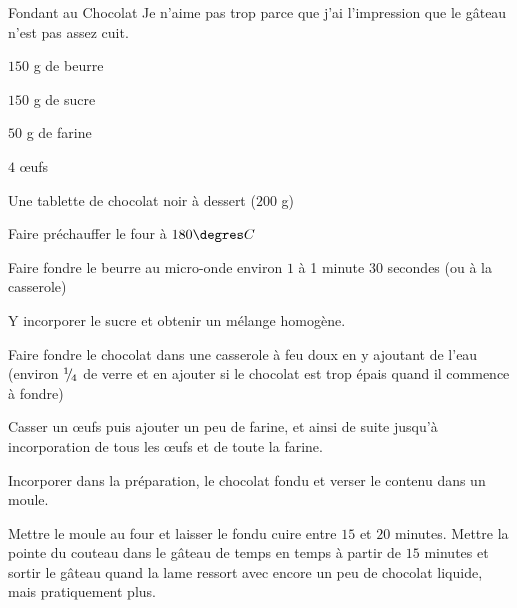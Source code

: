 \begin{recette}{Fondant au Chocolat}
Je n'aime pas trop parce que j'ai l'impression que le gâteau n'est pas assez cuit.
\begin{ingredients}
\item $150$ g de beurre
\item $150$ g de sucre
\item $50$ g de farine
\item $4$ œufs
\item Une tablette de chocolat noir à dessert ($200$ g)
\end{ingredients}

\begin{preparation}
\item Faire préchauffer le four à $180\degres C$
\item Faire fondre le beurre au micro-onde environ $1$ à 1 minute $30$ secondes (ou à la casserole)
\item Y incorporer le sucre et obtenir un mélange homogène.
\item Faire fondre le chocolat dans une casserole à feu doux en y ajoutant de l'eau (environ ${{}^{1\!\!}/ _{\!4}}$ de verre et en ajouter si le chocolat est trop épais quand il commence à fondre)
\item Casser un œufs puis ajouter un peu de farine, et ainsi de suite jusqu'à incorporation de tous les œufs et de toute la farine.
\item Incorporer dans la préparation, le chocolat fondu et verser le contenu dans un moule.
\end{preparation}

\begin{cuisson}
Mettre le moule au four et laisser le fondu cuire entre $15$ et $20$ minutes. Mettre la pointe du couteau dans le gâteau de temps en temps à partir de $15$ minutes et sortir le gâteau quand la lame ressort avec encore un peu de chocolat liquide, mais pratiquement plus.
\end{cuisson}
\end{recette}

